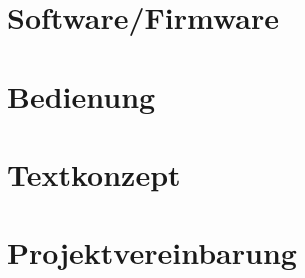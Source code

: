 \documentclass{fhnwreport/fhnwreport}
\begin{document}
\clearpage
\section{Software/Firmware}
\label{sec:software}


\clearpage
\section{Bedienung}
\label{sec:bedienung}


\clearpage
\section{Textkonzept}
\label{sec:testkonzept}


%


\clearpage
{}
{}
{}

\clearpage
\section*{Projektvereinbarung}
\label{sec:projektvereinbarung}

\end{document}
